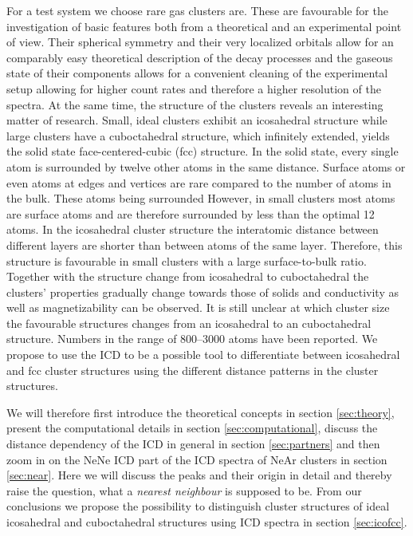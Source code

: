 For a test system we choose rare gas clusters are. These are favourable
for the investigation of basic features both
from a theoretical and an experimental point of view. Their spherical
symmetry and their very localized orbitals allow for an comparably easy
theoretical description of the decay processes and the gaseous state
of their components allows for a convenient cleaning of the experimental
setup allowing for higher count rates and therefore a higher resolution
of the spectra. At the same time, the structure of the clusters reveals an
interesting matter of research. Small, ideal clusters exhibit an icosahedral
structure while large clusters have a cuboctahedral structure, which
infinitely extended, yields the solid state face-centered-cubic (fcc) structure.
In the solid state, every single atom is surrounded by twelve other atoms in the
same distance. Surface atoms or even atoms at edges and vertices are rare
compared to the number of atoms in the bulk. 
These atoms being surrounded
However, in small clusters most atoms are surface atoms and are therefore
surrounded by less than the optimal 12 atoms.
In the icosahedral cluster structure the interatomic distance between different
layers are shorter than between atoms of the same layer. 
Therefore,
this structure is favourable in small clusters with a large surface-to-bulk ratio.
Together with the structure change from icosahedral to cuboctahedral
the clusters' properties gradually change towards those of solids and
conductivity as well as magnetizability can be observed. \cite{Benfield92}
It is still unclear at which cluster size the favourable structures changes from
an icosahedral to an cuboctahedral structure. Numbers in the range
of 800--3000 atoms have been reported. \cite{Hartke02,Pahl08}
We propose to use the ICD to be a possible tool to differentiate between
icosahedral and fcc cluster structures using the different distance
patterns in the cluster structures.

We will
therefore first introduce the theoretical concepts in section \ref{sec:theory},
present the computational details in section \ref{sec:computational},
discuss the distance dependency of the ICD in general
in section \ref{sec:partners} and then
zoom in on the NeNe ICD part of the ICD spectra of NeAr clusters
\cite{Fasshauer14_1} in section \ref{sec:near}. Here we will discuss the
peaks and their origin in detail and thereby
raise the question, what a \emph{nearest neighbour} is supposed to be. From
our conclusions we propose the possibility to distinguish cluster structures
of ideal icosahedral and cuboctahedral structures using ICD spectra in
section \ref{sec:icofcc}.

